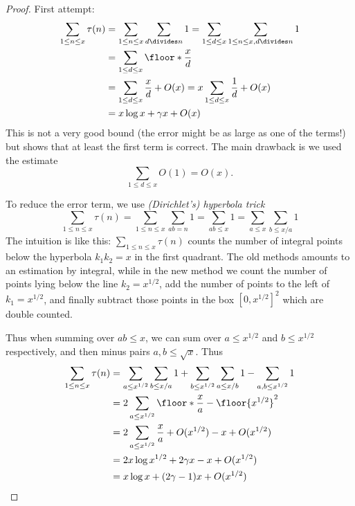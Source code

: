 \documentclass[a4paper]{article}
\theoremstyle{definition}
\begin{document}
\begin{proof}
  First attempt:
  \begin{align*}
    \sum_{1 \leq n \leq x} \tau(n)
    &= \sum_{1 \leq n \leq x} \sum_{d \divides n} 1
    = \sum_{1 \leq d \leq x} \sum_{1 \leq n \leq x, d \divides n} 1 \\
    &= \sum_{1 \leq d \leq x} \floor*{\frac{x}{d}} \\
    &= \sum_{1 \leq d \leq x} \frac{x}{d} + O(x)
    = x \sum_{1 \leq d \leq x} \frac{1}{d} + O(x) \\
    &= x\log x + \gamma x + O(x)
  \end{align*}
  This is not a very good bound (the error might be as large as one of the terms!) but shows that at least the first term is correct. The main drawback is we used the estimate
  \[
    \sum_{1 \leq d \leq x} O(1) = O(x).
  \]

  To reduce the error term, we use \emph{(Dirichlet's) hyperbola trick}
  \[
    \sum_{1 \leq n \leq x} \tau(n)
    = \sum_{1 \leq n \leq x} \sum_{ab = n} 1
    = \sum_{ab \leq x} 1
    = \sum_{a \leq x} \sum_{b \leq x/a} 1
  \]
  The intuition is like this: \(\sum_{1 \leq n \leq x} \tau(n)\) counts the number of integral points below the hyperbola \(k_1k_2 = x\) in the first quadrant. The old methods amounts to an estimation by integral, while in the new method we count the number of points lying below the line \(k_2 = x^{1/2}\), add the number of points to the left of \(k_1 = x^{1/2}\), and finally subtract those points in the box \([0, x^{1/2}]^2\) which are double counted.

  Thus when summing over \(ab \leq x\), we can sum over \(a \leq x^{1/2}\) and \(b \leq x^{1/2}\) respectively, and then minus pairs \(a, b \leq \sqrt x\). Thus
  \begin{align*}
    \sum_{1 \leq n \leq x} \tau(n)
    &= \sum_{a \leq x^{1/2}} \sum_{b \leq x/a} 1 + \sum_{b \leq x^{1/2}} \sum_{a \leq x/b} 1 - \sum_{a, b \leq x^{1/2}} 1 \\
    &= 2 \sum_{a \leq x^{1/2}} \floor*{\frac{x}{a}} - \floor{x^{1/2}}^2 \\
    &= 2 \sum_{a \leq x^{1/2}} \frac{x}{a} + O(x^{1/2}) - x + O(x^{1/2}) \\
    &= 2x\log x^{1/2} + 2 \gamma x - x + O(x^{1/2}) \\
    &= x \log x + (2\gamma - 1) x + O(x^{1/2})
  \end{align*}
\end{proof}
\end{document}
